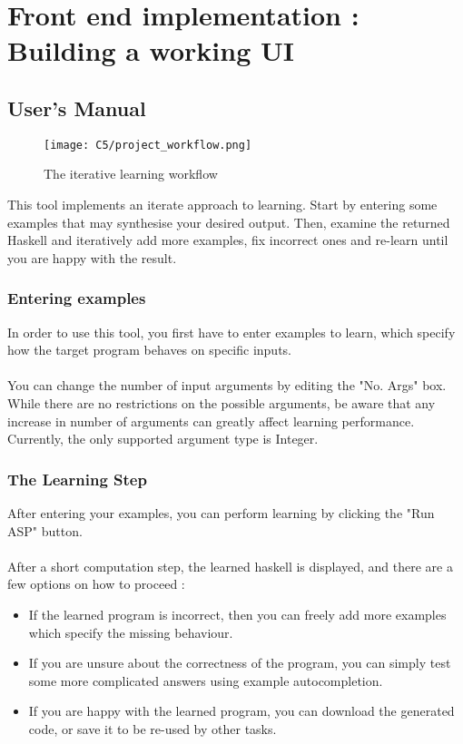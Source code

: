 \chapter{Front end implementation : Building a working UI}

\section{User's Manual}

\begin{figure}[h!]
\texttt{[image: C5/project\_workflow.png]}
\caption{The iterative learning workflow}
\end{figure}

This tool implements an iterate approach to learning. Start by entering some examples that may synthesise your desired output. Then, examine the returned Haskell and iteratively add more examples, fix incorrect ones and re-learn until you are happy with the result.

\subsection{Entering examples}

In order to use this tool, you first have to enter examples to learn, which specify how the target program behaves on specific inputs.\\ \\
You can change the number of input arguments by editing the "No. Args" box. While there are no restrictions on the possible arguments, be aware that any increase in number of arguments can greatly affect learning performance. Currently, the only supported argument type is Integer. 

\subsection{The Learning Step}

After entering your examples, you can perform learning by clicking the "Run ASP" button. \\ \\
After a short computation step, the learned haskell is displayed, and there are a few options on how to proceed : 

\begin{itemize}
\item If the learned program is incorrect, then you can freely add more examples which specify the missing behaviour.
\item If you are unsure about the correctness of the program, you can simply test some more complicated answers using example autocompletion.
\item If you are happy with the learned program, you can download the generated code, or save it to be re-used by other tasks.
\end{itemize}  

